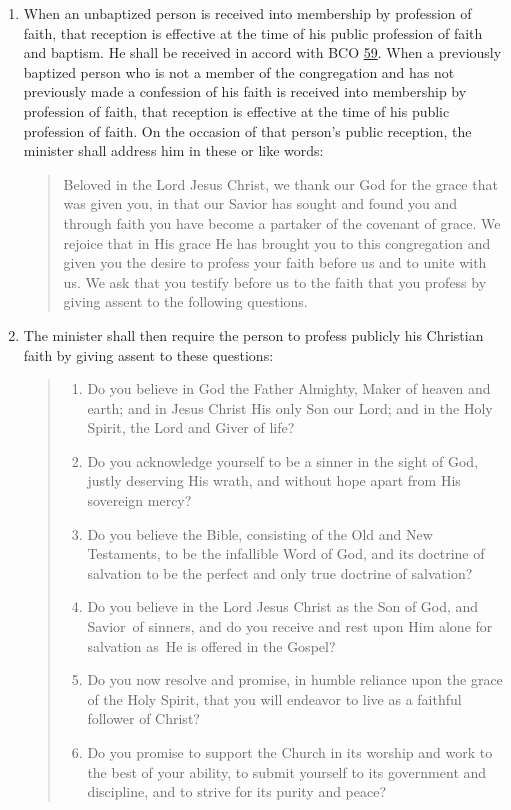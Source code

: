\documentclass[
]{book}
\providecommand{\tightlist}{%
  \setlength{\itemsep}{0pt}\setlength{\parskip}{0pt}}
\begin{document}
\protect\hypertarget{chapter-slug-66-reception-of-new-members-by-public-profession-of-faith}{\href{}{}}

\begin{enumerate}
\def\labelenumi{\arabic{enumi}.}
\item
  When an unbaptized person is received into membership by profession of faith, that reception is effective at the time of his public profession of faith and baptism. He shall be received in accord with BCO \protect\hyperlink{59}{59}. When a previously baptized person who is not a member of the congregation and has not previously made a confession of his faith is received into membership by profession of faith, that reception is effective at the time of his public profession of faith. On the occasion of that person's public reception, the minister shall address him in these or like words:

  \begin{quote}
  Beloved in the Lord Jesus Christ, we thank our God for the grace that was given you, in that our Savior has sought and found you and through faith you have become a partaker of the covenant of grace. We rejoice that in His grace He has brought you to this congregation and given you the desire to profess your faith before us and to unite with us. We ask that you testify before us to the faith that you profess by giving assent to the following questions.
  \end{quote}
\item
  The minister shall then require the person to profess publicly his Christian faith by giving assent to these questions:

  \begin{quote}
  \begin{enumerate}
  \def\labelenumii{(\arabic{enumii})}
  \tightlist
  \item
    Do you believe in God the Father Almighty, Maker of heaven and earth; and in Jesus Christ His only Son our Lord; and in the Holy Spirit, the Lord and Giver of life?
  \item
    Do you acknowledge yourself to be a sinner in the sight of God, justly deserving His wrath, and without hope apart from His sovereign mercy?
  \item
    Do you believe the Bible, consisting of the Old and New Testaments, to be the infallible Word of God, and its doctrine of salvation to be the perfect and only true doctrine of salvation?
  \item
    Do you believe in the Lord Jesus Christ as the Son of God, and Savior~of sinners, and do you receive and rest upon Him alone for salvation as~He is offered in the Gospel?
  \item
    Do you now resolve and promise, in humble reliance upon the grace of the Holy Spirit, that you will endeavor to live as a faithful follower of Christ?
  \item
    Do you promise to support the Church in its worship and work to the best of your ability, to submit yourself to its government and discipline, and to strive for its purity and peace?
  \end{enumerate}
  \end{quote}


\end{enumerate}
\end{document}

